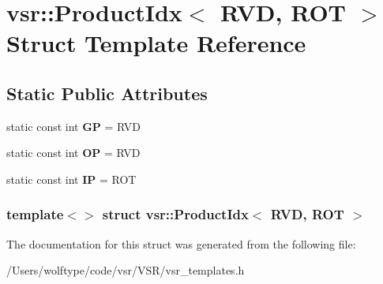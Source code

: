 \hypertarget{structvsr_1_1_product_idx_3_01_r_v_d_00_01_r_o_t_01_4}{\section{vsr\-:\-:Product\-Idx$<$ R\-V\-D, R\-O\-T $>$ Struct Template Reference}
\label{structvsr_1_1_product_idx_3_01_r_v_d_00_01_r_o_t_01_4}
}
\subsection*{Static Public Attributes}
\begin{DoxyCompactItemize}
\item 
\hypertarget{structvsr_1_1_product_idx_3_01_r_v_d_00_01_r_o_t_01_4_a4fb85b71b9961b8a2614de6786f4913b}{static const int {\bfseries G\-P} = R\-V\-D}\label{structvsr_1_1_product_idx_3_01_r_v_d_00_01_r_o_t_01_4_a4fb85b71b9961b8a2614de6786f4913b}

\item 
\hypertarget{structvsr_1_1_product_idx_3_01_r_v_d_00_01_r_o_t_01_4_ab91ea4bd921632f05dfcc068e107675e}{static const int {\bfseries O\-P} = R\-V\-D}\label{structvsr_1_1_product_idx_3_01_r_v_d_00_01_r_o_t_01_4_ab91ea4bd921632f05dfcc068e107675e}

\item 
\hypertarget{structvsr_1_1_product_idx_3_01_r_v_d_00_01_r_o_t_01_4_af6c64dc3060dbfcdaad96294a391f6ee}{static const int {\bfseries I\-P} = R\-O\-T}\label{structvsr_1_1_product_idx_3_01_r_v_d_00_01_r_o_t_01_4_af6c64dc3060dbfcdaad96294a391f6ee}

\end{DoxyCompactItemize}
\subsubsection*{template$<$$>$ struct vsr\-::\-Product\-Idx$<$ R\-V\-D, R\-O\-T $>$}



The documentation for this struct was generated from the following file\-:\begin{DoxyCompactItemize}
\item 
/\-Users/wolftype/code/vsr/\-V\-S\-R/vsr\-\_\-templates.\-h\end{DoxyCompactItemize}
